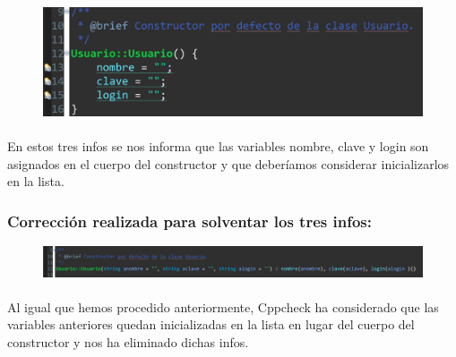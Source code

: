 			\begin{figure}[H]
				\centering
				\includegraphics[scale=0.55]{img/esteban28.png}
				\label{esteban28}
			\end{figure}
		
			\paragraph{}En estos tres infos se nos informa que las variables nombre, clave y login son asignados en el cuerpo del constructor y que deberíamos considerar inicializarlos en la lista.
			
		\subsubsection{Corrección realizada para solventar los tres infos:}
		
			\begin{figure}[H]
				\centering
				\includegraphics[scale=0.55]{img/esteban29.png}
				\label{esteban29}
			\end{figure}
		
			\paragraph{}Al igual que hemos procedido anteriormente, Cppcheck ha considerado que las variables anteriores quedan inicializadas en la lista en lugar del cuerpo del constructor y nos ha eliminado dichas infos.
\newpage